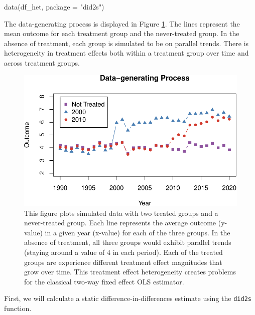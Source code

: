 \begin{Schunk}
\begin{Sinput}
data(df_het, package = "did2s")
\end{Sinput}
\end{Schunk}

The data-generating process is displayed in Figure \ref{fig:ex-data}.
The lines represent the mean outcome for each treatment group and the
never-treated group. In the absence of treatment, each group is
simulated to be on parallel trends. There is heterogeneity in treatment
effects both within a treatment group over time and across treatment
groups.

\begin{Schunk}
\begin{figure}
\includegraphics[width=1\linewidth]{did2s_files/figure-latex/ex-data-1} \caption[This figure plots simulated data with two treated groups and a never-treated group]{This figure plots simulated data with two treated groups and a never-treated group. Each line represents the average outcome (y-value) in a given year (x-value) for each of the three groups. In the absence of treatment, all three groups would exhibit parallel trends (staying around a value of 4 in each period). Each of the treated groups are experience different treatment effect magnitudes that grow over time. This treatment effect heterogeneity creates problems for the classical two-way fixed effect OLS estimator.}\label{fig:ex-data}
\end{figure}
\end{Schunk}

First, we will calculate a static difference-in-differences estimate
using the \texttt{did2s} function.

